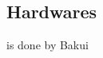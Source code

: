\documentclass{standalone}
\begin{document}
\subsection{Hardwares}

is done by Bakui
\end{document}
